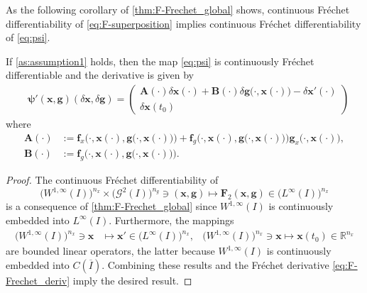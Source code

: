 \documentclass[onefignum,onetabnum]{siamart220329}
\numberwithin{equation}{section}
\newcommand {\real} {\mathbb{R}}
\newcommand{\bff}{\ensuremath{\mathbf{f}}} %
\newcommand{\bg}{\ensuremath{\mathbf{g}}} %
\newcommand{\bx}{\ensuremath{\mathbf{x}}} %
\newcommand {\bpsi} {\boldsymbol{\psi}}
\newcommand{\BA}{\ensuremath{\mathbf{A}} } %
\newcommand{\BB}{\ensuremath{\mathbf{B}} } %
\newcommand{\BF}{\ensuremath{\mathbf{F}} } %
\newcommand {\cG} {\mathcal{G}}
\newcommand{\WW}{\big( W^{1, \infty}(I) \big)^{n_x}}
\newcommand{\LL}{\big(L^\infty(I) \big)^{n_x}}
\begin{document}
As the following corollary of \cref{thm:F-Frechet_global} shows, continuous Fr\'echet differentiability of \cref{eq:F-superposition} implies continuous Fr\'echet differentiability of \cref{eq:psi}.

\begin{corollary} \label{cor:psi-Frechet_derivative}
If \cref{as:assumption1}  holds, then the map  \cref{eq:psi}
         is continuously Fr\'echet differentiable and the derivative is given by
	\begin{equation*}
	\begin{aligned}
		&\bpsi'(\bx, \bg)(\delta \bx, \delta \bg) 
		= \begin{pmatrix} \BA(\cdot) \delta \bx(\cdot) + \BB(\cdot)\delta \bg \big(\cdot, \bx(\cdot) \big) - \delta \bx'(\cdot) \\
		\delta \bx(t_0)
		 \end{pmatrix}
	\end{aligned}
	\end{equation*}
	where 
	\begin{equation} \label{eq:shorthand}
	\begin{aligned}
	  \BA(\cdot) &:= \bff_x\Big( \cdot,\bx(\cdot), \bg\big(\cdot, \bx(\cdot) \big) \Big)
	                          + \bff_g\Big( \cdot,\bx(\cdot), \bg\big(\cdot, \bx(\cdot) \big) \Big) \bg_x \big(\cdot, \bx(\cdot) \big), \\
	\BB(\cdot)  &:= \bff_g\Big( \cdot,\bx(\cdot), \bg\big(\cdot, \bx(\cdot) \big) \Big).
	\end{aligned}
	\end{equation}
\end{corollary}
\begin{proof}
	The continuous Fr\'echet differentiability of 
	$$\WW\times \big(\cG^2(I)\big)^{n_g}  \ni (\bx, \bg )
	 \mapsto  \BF_2(\bx, \bg ) \in  \LL$$  is a consequence of \cref{thm:F-Frechet_global} 
	 since $W^{1, \infty}(I)$ is continuously embedded into $L^\infty(I)$. 
	 Furthermore, the mappings 
	 \begin{align*}
	 \WW \ni \bx  &\mapsto \bx' \in   \LL,
	 &\WW \ni \bx  \mapsto \bx(t_0) \in \real^{n_x}
	 \end{align*} 
	 are bounded linear operators, the latter because $W^{1, \infty}(I)$ is continuously embedded into $C(\overline{I})$. 
	 Combining these results and the Fr\'echet derivative \cref{eq:F-Frechet_deriv} imply the desired result.
\end{proof}
\end{document}
